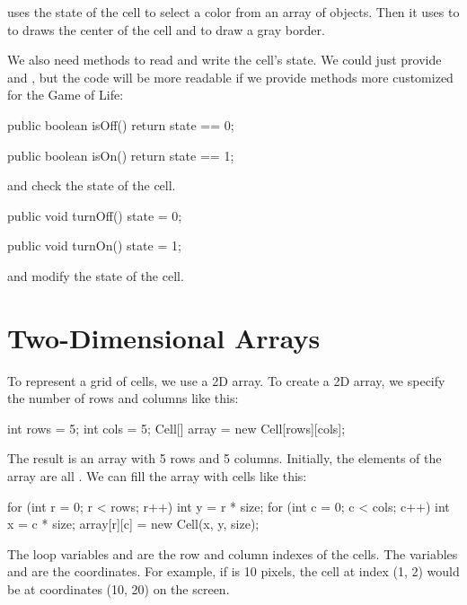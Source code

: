 uses the state of the cell to select a color from an array of  objects.
Then it uses to  to draws the center of the cell and  to draw a gray border.

We also need methods to read and write the cell's state.
We could just provide  and , but the code will be more readable if we provide methods more customized for the Game of Life:

\begin{code}
public boolean isOff() {
    return state == 0;
}

public boolean isOn() {
    return state == 1;
}
\end{code}

 and  check the state of the cell.

\begin{code}
public void turnOff() {
    state = 0;
}

public void turnOn() {
    state = 1;
}
\end{code}

 and  modify the state of the cell.


\section{Two-Dimensional Arrays}

To represent a grid of cells, we use a 2D array.
To create a 2D array, we specify the number of rows and columns like this:

\begin{code}
int rows = 5;
int cols = 5;
Cell[] array = new Cell[rows][cols];
\end{code}

The result is an array with 5 rows and 5 columns.
Initially, the elements of the array are all .
We can fill the array with cells like this:

\begin{code}
for (int r = 0; r < rows; r++) {
    int y = r * size;
    for (int c = 0; c < cols; c++) {
        int x = c * size;
        array[r][c] = new Cell(x, y, size);
    }
}
\end{code}

The loop variables  and  are the row and column indexes of the cells.
The variables  and  are the coordinates.
For example, if  is 10 pixels, the cell at index (1, 2) would be at coordinates (10, 20) on the screen.

